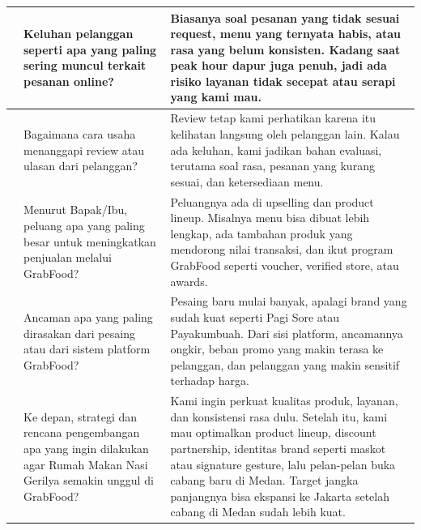 {\begin{longtable}{|>{\centering\arraybackslash}p{0.7cm}|p{4.4cm}|p{7.8cm}|}
            14           & Keluhan pelanggan seperti apa yang paling sering muncul terkait pesanan online?                                                & Biasanya soal pesanan yang tidak sesuai request, menu yang ternyata habis, atau rasa yang belum konsisten. Kadang saat peak hour dapur juga penuh, jadi ada risiko layanan tidak secepat atau serapi yang kami mau.                                                                                                                           \\ \hline
            15           & Bagaimana cara usaha menanggapi review atau ulasan dari pelanggan?                                                             & Review tetap kami perhatikan karena itu kelihatan langsung oleh pelanggan lain. Kalau ada keluhan, kami jadikan bahan evaluasi, terutama soal rasa, pesanan yang kurang sesuai, dan ketersediaan menu.                                                                                                                                        \\ \hline
            16           & Menurut Bapak/Ibu, peluang apa yang paling besar untuk meningkatkan penjualan melalui GrabFood?                                & Peluangnya ada di upselling dan product lineup. Misalnya menu bisa dibuat lebih lengkap, ada tambahan produk yang mendorong nilai transaksi, dan ikut program GrabFood seperti voucher, verified store, atau awards.                                                                                                                          \\ \hline
            17           & Ancaman apa yang paling dirasakan dari pesaing atau dari sistem platform GrabFood?                                             & Pesaing baru mulai banyak, apalagi brand yang sudah kuat seperti Pagi Sore atau Payakumbuah. Dari sisi platform, ancamannya ongkir, beban promo yang makin terasa ke pelanggan, dan pelanggan yang makin sensitif terhadap harga.                                                                                                             \\ \hline
            18           & Ke depan, strategi dan rencana pengembangan apa yang ingin dilakukan agar Rumah Makan Nasi Gerilya semakin unggul di GrabFood? & Kami ingin perkuat kualitas produk, layanan, dan konsistensi rasa dulu. Setelah itu, kami mau optimalkan product lineup, discount partnership, identitas brand seperti maskot atau signature gesture, lalu pelan-pelan buka cabang baru di Medan. Target jangka panjangnya bisa ekspansi ke Jakarta setelah cabang di Medan sudah lebih kuat. \\ \hline
        \end{longtable}
        \addtocounter{table}{-1}
    }

